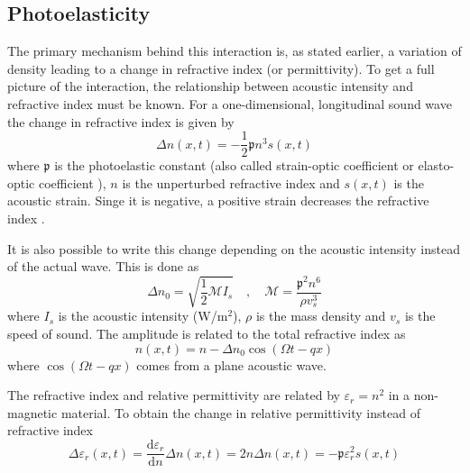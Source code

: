 \documentclass[10pt,a4paper,draft]{scrartcl}
\begin{document}
	\subsection{Photoelasticity}
	The primary mechanism behind this interaction is, as stated earlier, a variation of density leading to a change in refractive index (or permittivity). To get a full picture of the interaction, the relationship between acoustic intensity and refractive index must be known. For a one-dimensional, longitudinal sound wave the change in refractive index is given by \cite{Saleh2007}
	\begin{equation*}
	\Delta n (x,t) = -\frac{1}{2} \mathfrak{p} n^3 s(x,t)
	\end{equation*}
	where $\mathfrak{p}$ is the photoelastic constant (also called strain-optic coefficient or elasto-optic coefficient \cite{Korpel1988}), $n$ is the unperturbed refractive index and $s(x,t)$ is the acoustic strain. Singe it is negative, a positive strain decreases the refractive index \cite{Saleh2007}.
	
	It is also possible to write this change depending on the acoustic intensity instead of the actual wave. This is done as \cite{Saleh2007}
	\begin{equation*}
	\Delta n_0 = \sqrt{\frac{1}{2} \mathcal{M} I_s} \quad , \quad
	\mathcal{M} = \frac{\mathfrak{p}^2 n^6}{\rho v_s^3}
	\end{equation*}
	where $I_s$ is the acoustic intensity (W/m$^2$), $\rho$ is the mass density and $v_s$ is the speed of sound. The amplitude is related to the total refractive index as \cite{Saleh2007}
	\begin{equation*}
	n(x,t) = n - \Delta n_0 \cos(\Omega t - qx)
	\end{equation*}
	where $\cos(\Omega t - qx)$ comes from a plane acoustic wave.
	
	The refractive index and relative permittivity are related by $\varepsilon_r = n^2$ in a non-magnetic material. To obtain the change in relative permittivity instead of refractive index
	\begin{equation*}
	\Delta \varepsilon_r(x,t) = \frac{\mathrm{d}\varepsilon_r}{\mathrm{d}n} \Delta n(x,t) = 2n \Delta n(x,t) = -\mathfrak{p} \varepsilon_r^2 s(x,t)
	\end{equation*}
	
\end{document}
